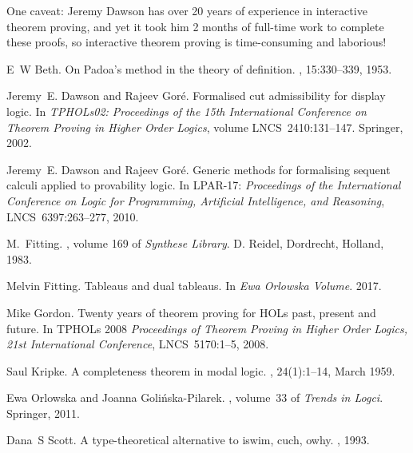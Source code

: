 \documentclass[a4paper]{article}
\begin{document}
One caveat: Jeremy Dawson has over 20 years
of experience in interactive theorem proving, and yet it took him 2
months of full-time work to complete these proofs, so interactive
theorem proving is time-consuming and laborious! 

% 
 

\begin{thebibliography}{OGP11}

E~W Beth.
\newblock On {Padoa's} method in the theory of definition.
, 15:330--339, 1953.

Jeremy~E. Dawson and Rajeev Gor{\'e}.
\newblock Formalised cut admissibility for display logic.
\newblock In {\em TPHOLs02:
  Proceedings of the 15th International Conference on Theorem Proving in Higher
  Order Logics}, volume LNCS~2410:131--147. Springer, 2002.

 Jeremy~E. Dawson and Rajeev
  Gor{\'{e}}.  \newblock Generic methods for formalising sequent
  calculi applied to provability logic.  \newblock In LPAR-17: {\em
    Proceedings of the International Conference on Logic for
    Programming, Artificial Intelligence, and Reasoning},
  LNCS~6397:263--277, 2010.

M.~Fitting.
, volume 169
  of {\em Synthese Library}.
\newblock D. Reidel, Dordrecht, Holland, 1983.

Melvin Fitting.
\newblock Tableaus and dual tableaus.
\newblock In {\em Ewa Orlowska Volume}. 2017.

 Mike Gordon.  
\newblock Twenty years of theorem proving for {HOL}s past, present and future.
\newblock In TPHOLs 2008 {\em Proceedings of Theorem Proving in
    Higher Order Logics, 21st International Conference}, LNCS~5170:1--5, 2008.

Saul Kripke.
\newblock A completeness theorem in modal logic.
, 24(1):1--14, March 1959.

Ewa Orlowska and Joanna Goli{\'n}ska-Pilarek.
,
  volume~33 of {\em Trends in Logci}.
\newblock Springer, 2011.

Dana~S Scott.
\newblock A type-theoretical alternative to iswim, cuch, owhy.
, 1993.

\end{thebibliography}
\end{document}
